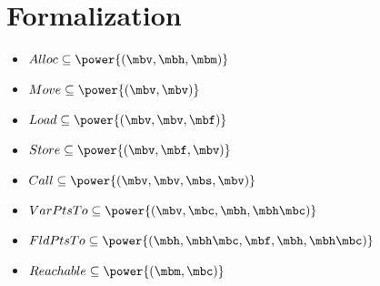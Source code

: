 \section{Formalization}
\begin{itemize}
  \item{$Alloc \subseteq \power{(\mbv,\mbh,\mbm)}$}
  \item{$Move \subseteq \power{(\mbv,\mbv)}$}
  \item{$Load \subseteq \power{(\mbv,\mbv,\mbf)}$}
  \item{$Store \subseteq \power{(\mbv,\mbf,\mbv)}$}
  \item{$Call \subseteq \power{(\mbv,\mbv,\mbs,\mbv)}$}
\end{itemize}


\begin{itemize}
  \item{$VarPtsTo \subseteq \power{(\mbv,\mbc,\mbh,\mbh\mbc)}$}
  \item{$FldPtsTo \subseteq \power{(\mbh,\mbh\mbc,\mbf,\mbh,\mbh\mbc)}$}
  \item{$Reachable \subseteq \power{(\mbm,\mbc)}$}
\end{itemize}


